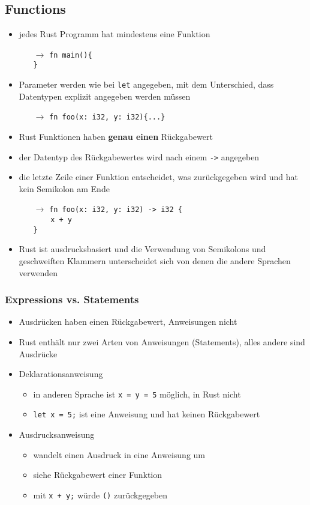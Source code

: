 \documentclass[a4paper,12pt]{article}
\begin{document}
\subsection{Functions}
	\begin{itemize}
	  \item jedes Rust Programm hat mindestens eine Funktion 
	  \begin{itemize}
	      \item[$\rightarrow$] \verb|fn main(){|\\ \verb|}| 
	  \end{itemize}
	  \item Parameter werden wie bei \verb|let| angegeben, mit dem Unterschied, dass Datentypen explizit angegeben werden müssen 
	  \begin{itemize}
	      \item[$\rightarrow$] \verb|fn foo(x: i32, y: i32){...}| 
	  \end{itemize}
	  \item Rust Funktionen haben \textbf{genau einen} Rückgabewert 
	  \item der Datentyp des Rückgabewertes wird nach einem \verb|->| angegeben
	  \item die letzte Zeile einer Funktion entscheidet, was zurückgegeben wird und hat kein Semikolon am Ende
	  \begin{itemize}
	      \item[$\rightarrow$] \verb|fn foo(x: i32, y: i32) -> i32 {| \\ 
	      \verb|    x + y|\\ \verb|}| 
	  \end{itemize}
	  \item Rust ist ausdrucksbasiert und die Verwendung von Semikolons und geschweiften Klammern unterscheidet sich von denen die andere Sprachen verwenden
	\end{itemize}
\subsubsection*{Expressions vs. Statements}
	\begin{itemize}
	  \item Ausdrücken haben einen Rückgabewert, Anweisungen nicht
	  \item Rust enthält nur zwei Arten von Anweisungen (Statements), alles andere sind Ausdrücke
	  \item Deklarationsanweisung
	  \begin{itemize}
	    \item in anderen Sprache ist \verb|x = y = 5| möglich, in Rust nicht
	    \item \verb|let x = 5;| ist eine Anweisung und hat keinen Rückgabewert
	  \end{itemize}
	  \item Ausdrucksanweisung
	  \begin{itemize}
	    \item wandelt einen Ausdruck in eine Anweisung um
	    \item siehe Rückgabewert einer Funktion
	    \item mit \verb|x + y;| würde \verb|()| zurückgegeben
	  \end{itemize}
	\end{itemize}
\end{document}
